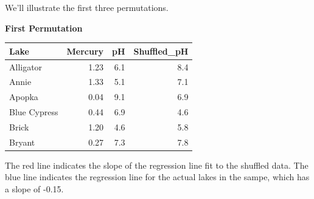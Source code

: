 \documentclass[
  letterpaper,
  DIV=11,
  numbers=noendperiod]{scrreprt}
\newenvironment{Shaded}{\begin{snugshade}}{\end{snugshade}}
\newcommand{\DecValTok}[1]{\textcolor[rgb]{0.68,0.00,0.00}{#1}}
\newcommand{\DocumentationTok}[1]{\textcolor[rgb]{0.37,0.37,0.37}{\textit{#1}}}
\newcommand{\FunctionTok}[1]{\textcolor[rgb]{0.28,0.35,0.67}{#1}}
\newcommand{\NormalTok}[1]{\textcolor[rgb]{0.00,0.23,0.31}{#1}}
\newcommand{\OtherTok}[1]{\textcolor[rgb]{0.00,0.23,0.31}{#1}}
\newcommand{\SpecialCharTok}[1]{\textcolor[rgb]{0.37,0.37,0.37}{#1}}
\newcommand{\StringTok}[1]{\textcolor[rgb]{0.13,0.47,0.30}{#1}}
\begin{document}
We'll illustrate the first three permutations.

\textbf{First Permutation}

\begin{Shaded}
\end{Shaded}

\begin{Shaded}
\end{Shaded}

\begin{longtable}[]{@{}lrrr@{}}
\toprule\noalign{}
Lake & Mercury & pH & Shuffled\_pH \\
\midrule\noalign{}
\endhead
\bottomrule\noalign{}
\endlastfoot
Alligator & 1.23 & 6.1 & 8.4 \\
Annie & 1.33 & 5.1 & 7.1 \\
Apopka & 0.04 & 9.1 & 6.9 \\
Blue Cypress & 0.44 & 6.9 & 4.6 \\
Brick & 1.20 & 4.6 & 5.8 \\
Bryant & 0.27 & 7.3 & 7.8 \\
\end{longtable}

The red line indicates the slope of the regression line fit to the
shuffled data. The blue line indicates the regression line for the
actual lakes in the sampe, which has a slope of -0.15.
\end{document}
